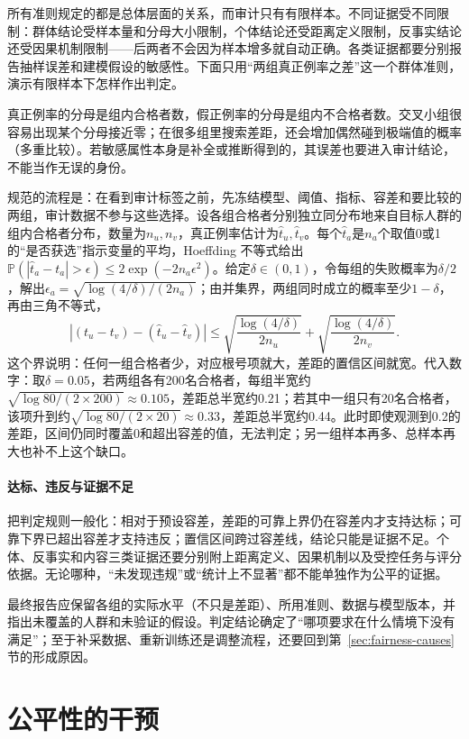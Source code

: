 所有准则规定的都是总体层面的关系，而审计只有有限样本。不同证据受不同限制：群体结论受样本量和分母大小限制，个体结论还受距离定义限制，反事实结论还受因果机制限制——后两者不会因为样本增多就自动正确。各类证据都要分别报告抽样误差和建模假设的敏感性。下面只用“两组真正例率之差”这一个群体准则，演示有限样本下怎样作出判定。

真正例率的分母是组内合格者数，假正例率的分母是组内不合格者数。交叉小组很容易出现某个分母接近零；在很多组里搜索差距，还会增加偶然碰到极端值的概率（多重比较）。若敏感属性本身是补全或推断得到的，其误差也要进入审计结论，不能当作无误的身份。

规范的流程是：在看到审计标签之前，先冻结模型、阈值、指标、容差和要比较的两组，审计数据不参与这些选择。设各组合格者分别独立同分布地来自目标人群的组内合格者分布，数量为$n_u,n_v$，真正例率估计为$\hat t_u,\hat t_v$。每个$\hat t_a$是$n_a$个取值0或1的“是否获选”指示变量的平均，Hoeffding 不等式给出$\mathbb P(|\hat t_a-t_a|>\epsilon)\leq2\exp(-2n_a\epsilon^2)$。给定$\delta\in(0,1)$，令每组的失败概率为$\delta/2$，解出$\epsilon_a=\sqrt{\log(4/\delta)/(2n_a)}$；由并集界，两组同时成立的概率至少$1-\delta$，再由三角不等式，
\[
 |(t_u-t_v)-(\hat t_u-\hat t_v)|
 \leq
 \sqrt{\frac{\log(4/\delta)}{2n_u}}
 +\sqrt{\frac{\log(4/\delta)}{2n_v}}.
\]
这个界说明：任何一组合格者少，对应根号项就大，差距的置信区间就宽。代入数字：取$\delta=0.05$，若两组各有200名合格者，每组半宽约$\sqrt{\log 80/(2\times200)}\approx0.105$，差距总半宽约0.21；若其中一组只有20名合格者，该项升到约$\sqrt{\log 80/(2\times20)}\approx0.33$，差距总半宽约0.44。此时即使观测到0.2的差距，区间仍同时覆盖0和超出容差的值，无法判定；另一组样本再多、总样本再大也补不上这个缺口。

\paragraph{达标、违反与证据不足}

把判定规则一般化：相对于预设容差，差距的可靠上界仍在容差内才支持达标；可靠下界已超出容差才支持违反；置信区间跨过容差线，结论只能是证据不足。个体、反事实和内容三类证据还要分别附上距离定义、因果机制以及受控任务与评分依据。无论哪种，“未发现违规”或“统计上不显著”都不能单独作为公平的证据。

最终报告应保留各组的实际水平（不只是差距）、所用准则、数据与模型版本，并指出未覆盖的人群和未验证的假设。判定结论确定了“哪项要求在什么情境下没有满足”；至于补采数据、重新训练还是调整流程，还要回到第~\ref{sec:fairness-causes}节的形成原因。

\section{公平性的干预}
\label{sec:fairness-intervention}

